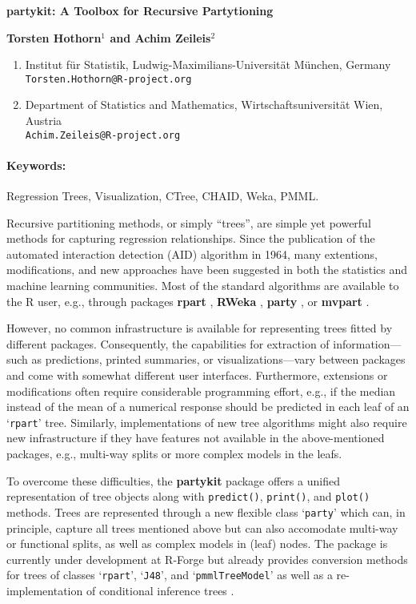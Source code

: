 \documentclass[10pt,a4paper]{article}
\renewcommand{\title}[1]{\begin{center}{\bf \LARGE #1}\end{center}}
\renewcommand{\author}[1]{\begin{center}{\bf #1}\end{center}}
\newenvironment{affiliations}{\footnotesize \begin{enumerate}}{\end{enumerate}}
\newenvironment{keywords}{\paragraph{Keywords:}}{\bigskip}
\let\code=\texttt
\let\pkg=\textbf
\let\proglang=\textsf
\newcommand{\class}[1]{`\code{#1}'}
\begin{document}
\pagestyle{empty}

\title{\pkg{partykit}: A Toolbox for Recursive Partytioning}
\author{Torsten Hothorn$^{1}$ and Achim Zeileis$^{2}$}

\begin{affiliations}
  \item Institut f\"ur Statistik, Ludwig-Maximilians-Universit\"at M\"unchen, Germany\\
        \texttt{Torsten.Hothorn@R-project.org}
  \item Department of Statistics and Mathematics, Wirtschaftsuniversit\"at Wien, Austria\\
        \texttt{Achim.Zeileis@R-project.org}
\end{affiliations}

\begin{keywords}
Regression Trees, Visualization, CTree, CHAID, Weka, PMML.
\end{keywords}

Recursive partitioning methods, or simply ``trees'', are simple yet powerful
methods for capturing regression relationships. Since the publication of the
automated interaction detection (AID) algorithm in 1964, many extentions,
modifications, and new approaches have been suggested in both the statistics
and machine learning communities. Most of the standard algorithms are
available to the \proglang{R} user, e.g., through packages
\pkg{rpart} \citep{partykit:rpart},
\pkg{RWeka} \citep{partykit:RWeka},
\pkg{party} \citep{partykit:party}, or
\pkg{mvpart} \citep{partykit:mvpart}.

However, no common infrastructure is available for representing trees
fitted by different packages. Consequently, the capabilities for extraction of
information---such as predictions, printed summaries, or visualizations---vary
between packages and come with somewhat different user interfaces.
Furthermore, extensions or modifications often require considerable
programming effort, e.g., if the median instead of the mean of a numerical
response should be predicted in each leaf of an \class{rpart} tree.
Similarly, implementations of new tree algorithms might also require new
infrastructure if they have features not available in the above-mentioned
packages, e.g., multi-way splits or more complex models in the leafs.

To overcome these difficulties, the \pkg{partykit} package \citep{partykit:partykit} offers a 
unified representation of tree objects along with \code{predict()}, 
\code{print()}, and \code{plot()} methods. Trees are represented through 
a new flexible class \class{party} which can, in principle, capture
all trees mentioned above but can also accomodate multi-way or functional
splits, as well as complex models in (leaf) nodes. The package is currently
under development at R-Forge but already provides conversion methods for
trees of classes \class{rpart}, \class{J48}, and \class{pmmlTreeModel}
as well as a re-implementation of conditional inference trees \citep{partykit:Hothorn+Hornik+Zeileis:2006}.
\end{document}
